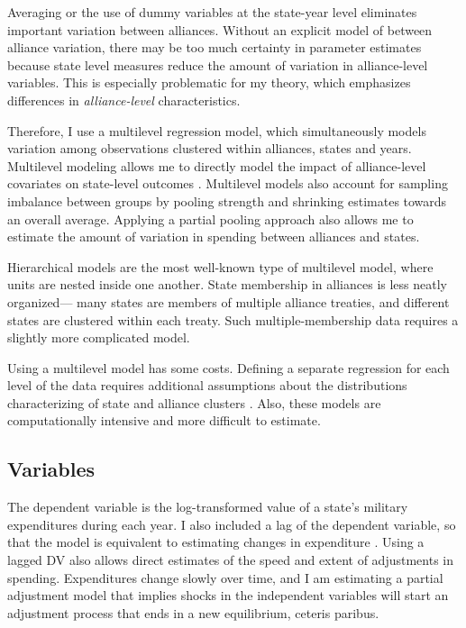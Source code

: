 \documentclass[12pt]{article}
\begin{document}
Averaging or the use of dummy variables at the state-year level eliminates important variation between alliances. Without an explicit model of between alliance variation, there may be too much certainty in parameter estimates \citep{McElreath2016} because state level measures reduce the amount of variation in alliance-level variables. This is especially problematic for my theory, which emphasizes differences in \textit{alliance-level} characteristics. 

Therefore, I use a multilevel regression model, which simultaneously models variation among observations clustered within alliances, states and years. Multilevel modeling allows me to directly model the impact of alliance-level covariates on state-level outcomes \citep{GelmanHill2007}. Multilevel models also account for sampling imbalance between groups by pooling strength and shrinking estimates towards an overall average. Applying a partial pooling approach also allows me to estimate the amount of variation in spending between alliances and states. 

Hierarchical models are the most well-known type of multilevel model, where units are nested inside one another. State membership in alliances is less neatly organized--- many states are members of multiple alliance treaties, and different states are clustered within each treaty. Such multiple-membership data requires a slightly more complicated model. 

Using a multilevel model has some costs. Defining a separate regression for each level of the data requires additional assumptions about the distributions characterizing of state and alliance clusters \citep{McElreath2016}. Also, these models are computationally intensive and more difficult to estimate.

\subsection*{Variables} 

The dependent variable is the log-transformed value of a state's military expenditures during each year. I also included a lag of the dependent variable, so that the model is equivalent to estimating changes in expenditure \cite{DeBoefKeele2008}. Using a lagged DV also allows direct estimates of the speed and extent of adjustments in spending. Expenditures change slowly over time, and I am estimating a partial adjustment model that implies shocks in the independent variables will start an adjustment process that ends in a new equilibrium, ceteris paribus. 
\end{document}
